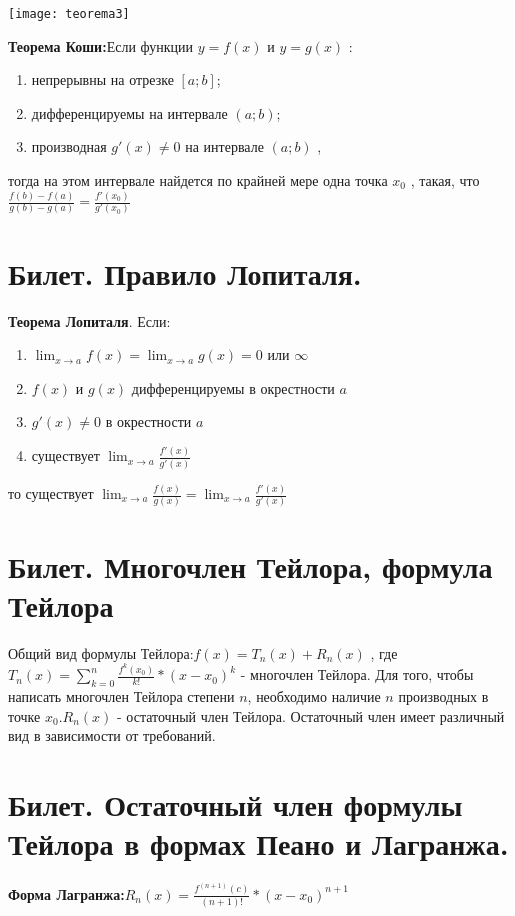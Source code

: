 \documentclass[12pt]{article}
\begin{document}
	\texttt{[image: teorema3]}
	
	\textbf{Теорема Коши:}Если функции $y=f(x)$ и $y=g(x)$ :  \begin{enumerate}
	\item непрерывны на отрезке $[a;b]$;
	\item дифференцируемы на интервале $(a;b)$;
	\item производная $g'(x) \not= 0$ на интервале $(a;b)$ , \end{enumerate}
	тогда на этом интервале найдется по крайней мере одна точка $x_0$  , такая, что
	$\frac{f(b)-f(a)}{g(b)-g(a)}=\frac{f'(x_0)}{g'(x_0)}$
	
	\section{Билет. Правило Лопиталя.}
	
	\textbf{Теорема Лопиталя}. Если: \begin{enumerate}
		\item $\lim_{x\to a}f(x)=\lim_{x\to a}g(x)=0$ или $\infty$
		\item $f(x)$ и $g(x)$ дифференцируемы в окрестности $a$
		\item $g'(x)\not= 0$ в окрестности $a$
		\item существует $\lim_{x\to a}\frac{f'(x)}{g'(x)}$
	\end{enumerate} то существует $\lim_{x\to a}\frac{f(x)}{g(x)}=\lim_{x\to a}\frac{f'(x)}{g'(x)}$
	
	\section{Билет. Многочлен Тейлора, формула Тейлора}
	
	Общий вид формулы Тейлора:$f(x)=T_n(x)+R_n(x)$ , где \newline $T_n(x)=\sum_{k=0}^{n}\frac{f^k(x_0)}{k!}*(x-x_0)^k$ - многочлен Тейлора. Для того, чтобы написать многочлен Тейлора степени $n$, необходимо наличие $n$ производных в точке $x_0$.$R_n(x)$  - остаточный член Тейлора. Остаточный член имеет различный вид в зависимости от требований. 
	
	\section{Билет. Остаточный член формулы Тейлора в формах Пеано и Лагранжа.}
	
	\textbf{Форма Лагранжа:}$R_n(x)=\frac{f^{(n+1)}(c)}{(n+1)!}*(x-x_0)^{n+1}$
	
\end{document}
